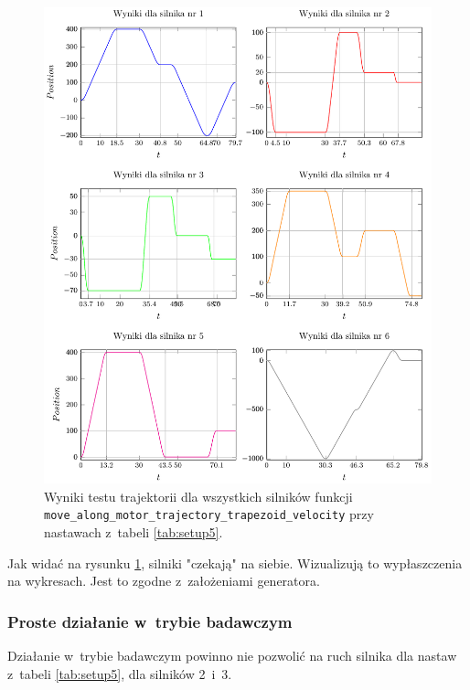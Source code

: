 \documentclass[a4paper, 12pt]{article}
\begin{document}
	\begin{figure}[H]
		\centering
		\includegraphics[scale=1.1]{raport_graphs/simpMTVall.pdf}
		\caption{Wyniki testu trajektorii dla wszystkich silników funkcji \texttt{move\_along\_motor\_trajectory\_trapezoid\_velocity} przy nastawach z~tabeli \ref{tab:setup5}.}
		\label{fig:simpMTVall}
	\end{figure}
	
	Jak widać na rysunku \ref{fig:simpMTVall}, silniki "czekają" na siebie. Wizualizują to wypłaszczenia na wykresach. Jest to zgodne z~założeniami generatora. 
	
	\subsubsection{Proste działanie w~trybie badawczym}
	Działanie w~trybie badawczym powinno nie pozwolić na ruch silnika dla nastaw z~tabeli \ref{tab:setup5}, dla silników 2~i~3. 
	
\end{document}
